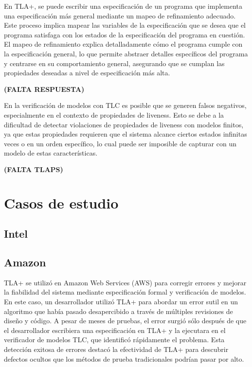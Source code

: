 \documentclass[runningheads]{llncs}
\begin{document}
En TLA+, se puede escribir una especificación de un programa que implementa una especificación más general mediante un mapeo de refinamiento adecuado. Este proceso implica mapear las variables de la especificación que se desea que el programa satisfaga con los estados de la especificación del programa en cuestión. El mapeo de refinamiento explica detalladamente cómo el programa cumple con la especificación general, lo que permite abstraer detalles específicos del programa y centrarse en su comportamiento general, asegurando que se cumplan las propiedades deseadas a nivel de especificación más alta.

\textbf{(FALTA RESPUESTA)}

En la verificación de modelos con TLC es posible que se generen falsos negativos, especialmente en el contexto de propiedades de liveness. Esto se debe a la dificultad de detectar violaciones de propiedades de liveness con modelos finitos, ya que estas propiedades requieren que el sistema alcance ciertos estados infinitas veces o en un orden específico, lo cual puede ser imposible de capturar con un modelo de estas características.

\textbf{(FALTA TLAPS)}

\section{Casos de estudio}
\subsection{Intel}
\cite{tla}

\subsection{Amazon}
TLA+ se utilizó en Amazon Web Services (AWS) \cite{amazon} para corregir errores y mejorar la fiabilidad del sistema mediante especificación formal y verificación de modelos. En este caso, un desarrollador utilizó TLA+ para abordar un error sutil en un algoritmo que había pasado desapercibido a través de múltiples revisiones de diseño y código. A pesar de meses de pruebas, el error surgió sólo después de que el desarrollador escribiera una especificación en TLA+ y la ejecutara en el verificador de modelos TLC, que identificó rápidamente el problema. Esta detección exitosa de errores destacó la efectividad de TLA+ para descubrir defectos ocultos que los métodos de prueba tradicionales podrían pasar por alto.
\end{document}
